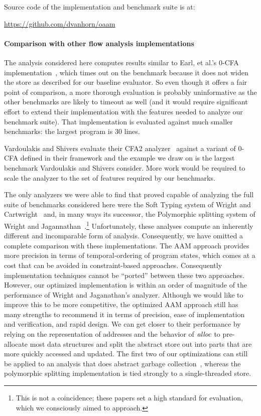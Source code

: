 \documentclass[preprint,onecolumn,9pt]{sigplanconf} %
\begin{document}
Source code of the implementation and benchmark suite is at:

\begin{center}
\url{https://github.com/dvanhorn/oaam}
\end{center}

\paragraph{Comparison with other flow analysis implementations}

The analysis considered here computes results similar to Earl, et al.'s
0-CFA implementation~\cite{dvanhorn:Earl2012Introspective}, which
times out on the \Church{} benchmark because it does not widen the
store as described for our baseline evaluator.  So even though it
offers a fair point of comparison, a more thorough evaluation is
probably uninformative as the other benchmarks are likely to timeout
as well (and it would require significant effort to extend their
implementation with the features needed to analyze our benchmark
suite).  That implementation is evaluated against much smaller
benchmarks: the largest program is 30 lines.

Vardoulakis and Shivers evaluate their CFA2
analyzer~\cite{dvanhorn:Vardoulakis2011CFA2} against a variant of
0-CFA defined in their framework and the example we draw on is the
largest benchmark Vardoulakis and Shivers consider.  More work would
be required to scale the analyzer to the set of features required by
our benchmarks.

The only analyzers we were able to find that proved capable of
analyzing the full suite of benchmarks considered here were the Soft
Typing system of Wright and
Cartwright~\cite{dvanhorn:Wright1997Practical} and, in many ways its
successor, the Polymorphic splitting system of Wright and
Jagannathan~\cite{dvanhorn:wright-jagannathan-toplas98}.\footnote{This
  is not a coincidence; these papers set a high standard for
  evaluation, which we consciously aimed to approach.}  Unfortunately,
these analyses compute an inherently different and incomparable form
of analysis.  Consequently, we have omitted a complete comparison with
these implementations.  The AAM approach provides more precision in
terms of temporal-ordering of program states, which comes at a cost
that can be avoided in constraint-based approaches.  Consequently
implementation techniques cannot be ``ported'' between these two
approaches.  However, our optimized implementation is within an order
of magnitude of the performance of Wright and Jaganathan's analyzer.
Although we would like to improve this to be more competitive, the
optimized AAM approach still has many strengths to recommend it in
terms of precision, ease of implementation and verification, and rapid
design. We can get closer to their performance by relying on the
representation of addresses and the behavior of $\mathit{alloc}$ to
pre-allocate most data structures and split the abstract store out
into parts that are more quickly accessed and updated. The first two
of our optimizations can still be applied to an analysis that does
abstract garbage collection~\cite{dvanhorn:Might:2006:GammaCFA},
whereas the polymorphic splitting implementation is tied strongly to a
single-threaded store.
\end{document}
